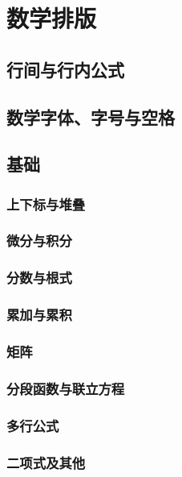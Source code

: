 {\chapter{数学排版}
\section{行间与行内公式}

\section{数学字体、字号与空格}
\label{sec:mathfont}

\section{基础}
\subsection{上下标与堆叠}

\subsection{微分与积分}

\subsection{分数与根式}

\subsection{累加与累积}

\subsection{矩阵}

\subsection{分段函数与联立方程}

\subsection{多行公式}

\subsection{二项式及其他}

}
